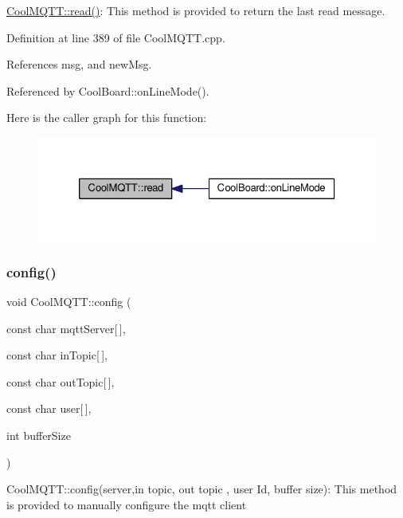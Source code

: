 \hyperlink{class_cool_m_q_t_t_ae3c18f6ae9723746d32765f1c8f176ca}{Cool\+M\+Q\+T\+T\+::read()}\+: This method is provided to return the last read message. 

Definition at line 389 of file Cool\+M\+Q\+T\+T.\+cpp.



References msg, and new\+Msg.



Referenced by Cool\+Board\+::on\+Line\+Mode().

Here is the caller graph for this function\+:
\nopagebreak
\begin{figure}[H]
\begin{center}
\leavevmode
\includegraphics[width=326pt]{d0/dd0/class_cool_m_q_t_t_ae3c18f6ae9723746d32765f1c8f176ca_icgraph}
\end{center}
\end{figure}
\mbox{\label{class_cool_m_q_t_t_a9b703de4f1358f0ee7a5e8c44979c648}} 
\subsubsection{\texorpdfstring{config()}{config()}\hspace{0.1cm}{\footnotesize\ttfamily [1/2]}}
{\footnotesize\ttfamily void Cool\+M\+Q\+T\+T\+::config (\begin{DoxyParamCaption}\item[{const char}]{mqtt\+Server\mbox{[}$\,$\mbox{]},  }\item[{const char}]{in\+Topic\mbox{[}$\,$\mbox{]},  }\item[{const char}]{out\+Topic\mbox{[}$\,$\mbox{]},  }\item[{const char}]{user\mbox{[}$\,$\mbox{]},  }\item[{int}]{buffer\+Size }\end{DoxyParamCaption})}

Cool\+M\+Q\+T\+T\+::config(server,in topic, out topic , user Id, buffer size)\+: This method is provided to manually configure the mqtt client 

